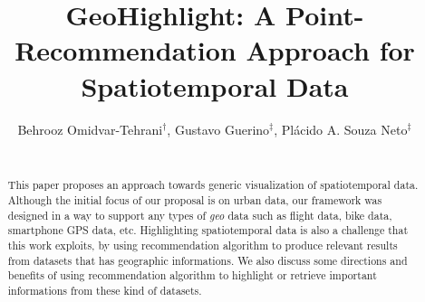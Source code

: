 \documentclass{sig-alternate-05-2015}
\begin{document}


\newtheorem{problem}{Problem}
\newtheorem{definition}{Definition}

 





\title{GeoHighlight: A Point-Recommendation Approach for Spatiotemporal Data}



\author{
Behrooz Omidvar-Tehrani$^{\dag}$, Gustavo Guerino$^{\ddag}$, Pl\'acido A. Souza Neto$^{\ddag}$\\
\\
}


\maketitle
\begin{abstract}

This paper proposes an approach towards generic visualization of
spatiotemporal data. Although the initial focus of our proposal is on urban
data, our framework was designed in a way to support any types of
\textit{geo} data such as flight data, bike data, smartphone GPS data, etc.
Highlighting spatiotemporal data is also a challenge that this work exploits, by using
recommendation algorithm to produce relevant results from datasets that has
geographic informations. We also discuss some directions and benefits of using
recommendation algorithm to highlight or retrieve important informations from
these kind of datasets.

\end{abstract}
\end{document}
